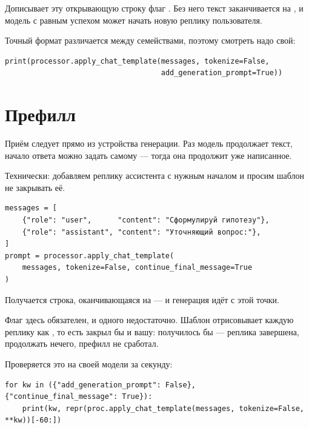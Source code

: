 \documentclass[11pt,a4paper]{article}
\begin{document}
Дописывает эту открывающую строку флаг .
Без него текст заканчивается на , и модель с равным
успехом может начать новую реплику пользователя.

Точный формат различается между семействами, поэтому смотреть надо свой:

\begin{Verbatim}
print(processor.apply_chat_template(messages, tokenize=False,
                                    add_generation_prompt=True))
\end{Verbatim}

\section{Префилл}

Приём следует прямо из устройства генерации. Раз модель продолжает
текст, начало ответа можно задать самому — тогда она продолжит уже
написанное.

Технически: добавляем реплику ассистента с нужным началом и просим
шаблон не закрывать её.

\begin{Verbatim}
messages = [
    {"role": "user",      "content": "Сформулируй гипотезу"},
    {"role": "assistant", "content": "Уточняющий вопрос:"},
]
prompt = processor.apply_chat_template(
    messages, tokenize=False, continue_final_message=True
)
\end{Verbatim}

Получается строка, оканчивающаяся на  — и генерация идёт с этой точки.

\begin{keybox}
Флаг  здесь обязателен, и одного
 недостаточно. Шаблон отрисовывает
каждую реплику как , то есть
закрыл бы и вашу: получилось бы  —
реплика завершена, продолжать нечего, префилл не сработал.
\end{keybox}

Проверяется это на своей модели за секунду:

\begin{Verbatim}
for kw in ({"add_generation_prompt": False}, {"continue_final_message": True}):
    print(kw, repr(proc.apply_chat_template(messages, tokenize=False, **kw))[-60:])
\end{Verbatim}
\end{document}
